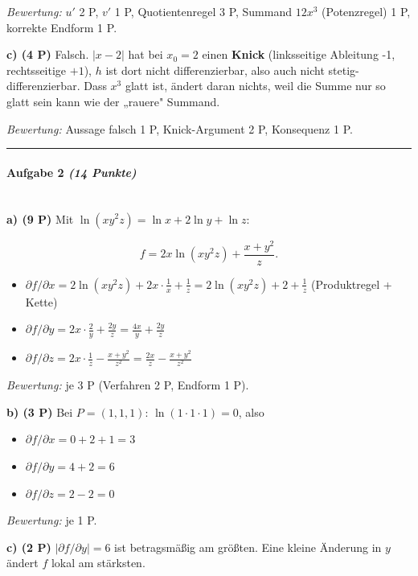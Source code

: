 \documentclass[11pt, a4paper]{article}
\begin{document}
\textit{Bewertung:} $u'$ 2 P, $v'$ 1 P, Quotientenregel 3 P, Summand $12x^3$ (Potenzregel) 1 P, korrekte Endform 1 P.


\textbf{c) (4 P)} Falsch. $|x-2|$ hat bei $x_0=2$ einen \textbf{Knick} (linksseitige Ableitung -1, rechtsseitige $+1$), $h$ ist dort nicht differenzierbar, also auch nicht stetig-differenzierbar. Dass $x^3$ glatt ist, ändert daran nichts, weil die Summe nur so glatt sein kann wie der „rauere" Summand.

\textit{Bewertung:} Aussage falsch 1 P, Knick-Argument 2 P, Konsequenz 1 P.



\noindent\textcolor{rulegray}{\rule{\linewidth}{0.4pt}}


\paragraph{Aufgabe 2 \textit{(14 Punkte)}}\mbox{}\\[2pt]

\textbf{a) (9 P)} Mit $\ln(xy^2z) = \ln x + 2\ln y + \ln z$:

\[
f = 2x\ln(xy^2z) + \frac{x+y^2}{z}.
\]

\begin{itemize}
  \item $\partial f/\partial x = 2\ln(xy^2z) + 2x\cdot \tfrac{1}{x} + \tfrac{1}{z} = 2\ln(xy^2z) + 2 + \tfrac{1}{z}$ (Produktregel + Kette)
  \item $\partial f/\partial y = 2x\cdot \tfrac{2}{y} + \tfrac{2y}{z} = \tfrac{4x}{y} + \tfrac{2y}{z}$
  \item $\partial f/\partial z = 2x\cdot \tfrac{1}{z} - \tfrac{x+y^2}{z^2} = \tfrac{2x}{z} - \tfrac{x+y^2}{z^2}$
\end{itemize}

\textit{Bewertung:} je 3 P (Verfahren 2 P, Endform 1 P).


\textbf{b) (3 P)} Bei $P=(1,1,1)$: $\ln(1\cdot 1\cdot 1) = 0$, also

\begin{itemize}
  \item $\partial f/\partial x = 0 + 2 + 1 = 3$
  \item $\partial f/\partial y = 4 + 2 = 6$
  \item $\partial f/\partial z = 2 - 2 = 0$
\end{itemize}

\textit{Bewertung:} je 1 P.


\textbf{c) (2 P)} $|\partial f/\partial y| = 6$ ist betragsmäßig am größten. Eine kleine Änderung in $y$ ändert $f$ lokal am stärksten.
\end{document}
